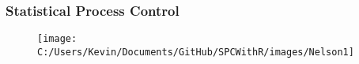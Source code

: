 \documentclass{beamer}
\begin{document}
\begin{frame}
\frametitle{Statistical Process Control}
\vspace{-1cm}
\begin{figure}
\centering
\texttt{[image: C:/Users/Kevin/Documents/GitHub/SPCWithR/images/Nelson1]}

\end{figure}

\end{frame}
\end{document}
